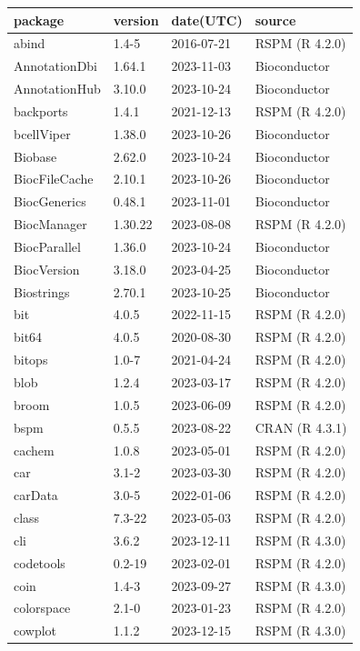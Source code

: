 \begin{longtable}[t]{llll}
\toprule
package & version & date(UTC) & source\\
\midrule
abind & 1.4-5 & 2016-07-21 & RSPM (R 4.2.0)\\
AnnotationDbi & 1.64.1 & 2023-11-03 & Bioconductor\\
AnnotationHub & 3.10.0 & 2023-10-24 & Bioconductor\\
backports & 1.4.1 & 2021-12-13 & RSPM (R 4.2.0)\\
bcellViper & 1.38.0 & 2023-10-26 & Bioconductor\\
\addlinespace
Biobase & 2.62.0 & 2023-10-24 & Bioconductor\\
BiocFileCache & 2.10.1 & 2023-10-26 & Bioconductor\\
BiocGenerics & 0.48.1 & 2023-11-01 & Bioconductor\\
BiocManager & 1.30.22 & 2023-08-08 & RSPM (R 4.2.0)\\
BiocParallel & 1.36.0 & 2023-10-24 & Bioconductor\\
\addlinespace
BiocVersion & 3.18.0 & 2023-04-25 & Bioconductor\\
Biostrings & 2.70.1 & 2023-10-25 & Bioconductor\\
bit & 4.0.5 & 2022-11-15 & RSPM (R 4.2.0)\\
bit64 & 4.0.5 & 2020-08-30 & RSPM (R 4.2.0)\\
bitops & 1.0-7 & 2021-04-24 & RSPM (R 4.2.0)\\
\addlinespace
blob & 1.2.4 & 2023-03-17 & RSPM (R 4.2.0)\\
broom & 1.0.5 & 2023-06-09 & RSPM (R 4.2.0)\\
bspm & 0.5.5 & 2023-08-22 & CRAN (R 4.3.1)\\
cachem & 1.0.8 & 2023-05-01 & RSPM (R 4.2.0)\\
car & 3.1-2 & 2023-03-30 & RSPM (R 4.2.0)\\
\addlinespace
carData & 3.0-5 & 2022-01-06 & RSPM (R 4.2.0)\\
class & 7.3-22 & 2023-05-03 & RSPM (R 4.2.0)\\
cli & 3.6.2 & 2023-12-11 & RSPM (R 4.3.0)\\
codetools & 0.2-19 & 2023-02-01 & RSPM (R 4.2.0)\\
coin & 1.4-3 & 2023-09-27 & RSPM (R 4.3.0)\\
\addlinespace
colorspace & 2.1-0 & 2023-01-23 & RSPM (R 4.2.0)\\
cowplot & 1.1.2 & 2023-12-15 & RSPM (R 4.3.0)\\

\end{longtable}
